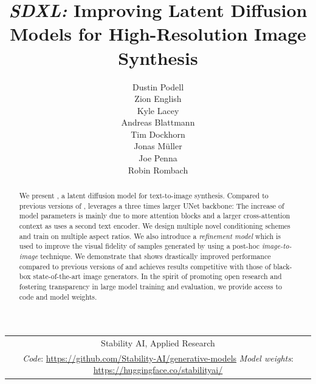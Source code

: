 \documentclass{article}
\title{\emph{SDXL:} Improving Latent Diffusion Models for High-Resolution Image Synthesis}
\author{%
    Dustin Podell \\
    \And 
    Zion English \\
    \And 
    Kyle Lacey \\
    \And 
    Andreas Blattmann \\
    \And 
    Tim Dockhorn \\
    \And 
    Jonas M\"uller \\
    \And 
    Joe Penna \\
    \And 
    Robin Rombach \\
}
\begin{document}
\vspace{-2em}
\enlargethispage\baselineskip
\vspace{-15em}
\maketitle
%
\vspace{-2em}
%
\begin{tabular}{c}
    \small Stability AI, Applied Research \\
    \addlinespace[5pt]
    \scriptsize {\emph{Code}: \url{https://github.com/Stability-AI/generative-models} \quad \emph{Model weights}: \url{https://huggingface.co/stabilityai/}}
\end{tabular}
%
%
\teaser
\vspace{-1em}
\begin{abstract}
We present \modelname, a latent diffusion model for text-to-image synthesis. 
Compared to previous versions of \sd, \modelname leverages a three times larger UNet backbone: The increase of model parameters is mainly due to more attention blocks and a larger cross-attention context as \modelname uses a second text encoder. 
We design multiple novel conditioning schemes and train \modelname on multiple aspect ratios. 
We also introduce a \emph{refinement model} which is 
%
%
used to improve the visual fidelity of samples generated by \modelname using a post-hoc \emph{image-to-image} technique.
%
%
We demonstrate that \modelname shows drastically improved performance compared to previous versions of \sd and achieves results competitive with those of black-box state-of-the-art image generators.
%
In the spirit of promoting open research and fostering transparency in large model training and evaluation, we provide access to code and model weights.
%

\end{abstract}



%
%
%
%

%
%
%
%
\end{document}
